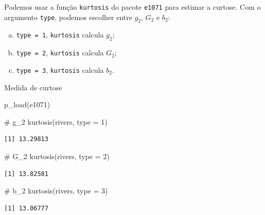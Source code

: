 \documentclass[
  10pt,
  ignorenonframetext,
]{beamer}
\newenvironment{Shaded}{\begin{snugshade}}{\end{snugshade}}
\newcommand{\AttributeTok}[1]{\textcolor[rgb]{0.40,0.45,0.13}{#1}}
\newcommand{\CommentTok}[1]{\textcolor[rgb]{0.37,0.37,0.37}{#1}}
\newcommand{\DecValTok}[1]{\textcolor[rgb]{0.68,0.00,0.00}{#1}}
\newcommand{\FunctionTok}[1]{\textcolor[rgb]{0.28,0.35,0.67}{#1}}
\newcommand{\NormalTok}[1]{\textcolor[rgb]{0.00,0.23,0.31}{#1}}
\providecommand{\tightlist}{%
  \setlength{\itemsep}{0pt}\setlength{\parskip}{0pt}}\usepackage{longtable,booktabs,array}
\begin{document}
\begin{frame}[fragile]
Podemos usar a função \texttt{kurtosis} do pacote \texttt{e1071} para
estimar a curtose. Com o argumento \texttt{type}, podemos escolher entre
\(g_2\), \(G_2\) e \(b_2\):

\begin{enumerate}
[a.]
\tightlist
\item
  \texttt{type\ =\ 1}, \texttt{kurtosis} calcula \(g_2\);
\item
  \texttt{type\ =\ 2}, \texttt{kurtosis} calcula \(G_2\);
\item
  \texttt{type\ =\ 3}, \texttt{kurtosis} calcula \(b_2\).
\end{enumerate}
\end{frame}

\begin{frame}[fragile]{Medida de curtose}
\protect\hypertarget{medida-de-curtose-2}{}
\begin{Shaded}
\begin{Highlighting}[]
\FunctionTok{p\_load}\NormalTok{(e1071)}

\CommentTok{\# g\_2}
\FunctionTok{kurtosis}\NormalTok{(rivers, }\AttributeTok{type =} \DecValTok{1}\NormalTok{)}
\end{Highlighting}
\end{Shaded}

\begin{verbatim}
[1] 13.29813
\end{verbatim}

\begin{Shaded}
\begin{Highlighting}[]
\CommentTok{\# G\_2}
\FunctionTok{kurtosis}\NormalTok{(rivers, }\AttributeTok{type =} \DecValTok{2}\NormalTok{)}
\end{Highlighting}
\end{Shaded}

\begin{verbatim}
[1] 13.82581
\end{verbatim}

\begin{Shaded}
\begin{Highlighting}[]
\CommentTok{\# b\_2}
\FunctionTok{kurtosis}\NormalTok{(rivers, }\AttributeTok{type =} \DecValTok{3}\NormalTok{)}
\end{Highlighting}
\end{Shaded}

\begin{verbatim}
[1] 13.06777
\end{verbatim}
\end{frame}
\end{document}
